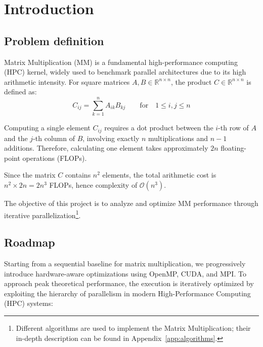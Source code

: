 \section{Introduction}

\subsection{Problem definition}

Matrix Multiplication (MM) is a fundamental high-performance computing (HPC) kernel, widely used to benchmark parallel architectures due to its high arithmetic intensity. For square matrices $A, B \in \mathbb{R}^{n \times n}$, the product $C \in \mathbb{R}^{n \times n}$ is defined as:
\begin{equation}
    C_{ij} = \sum_{k=1}^{n} A_{ik} B_{kj} \qquad \text{for} \quad 1 \le i, j \le n
\end{equation}

Computing a single element $C_{ij}$ requires a dot product between the $i$-th row of $A$ and the $j$-th column of $B$, involving exactly $n$ multiplications and $n-1$ additions. Therefore, calculating one element takes approximately $2n$ floating-point operations (FLOPs). 

Since the matrix $C$ contains $n^2$ elements, the total arithmetic cost is $n^2 \times 2n = 2n^3$ FLOPs, hence complexity of $\mathcal{O}(n^3)$. 

The objective of this project is to analyze and optimize MM performance through iterative parallelization\footnote{Different algorithms are used to implement the Matrix Multiplication; their in-depth description can be found in Appendix~\ref{app:algorithms}.}. 


\subsection{Roadmap}\label{subsec:iterative_improvements}

Starting from a sequential baseline for matrix multiplication, we progressively introduce hardware-aware optimizations using OpenMP, CUDA, and MPI. 
To approach peak theoretical performance, the execution is iteratively optimized by exploiting the hierarchy of parallelism in modern High-Performance Computing (HPC) systems:

